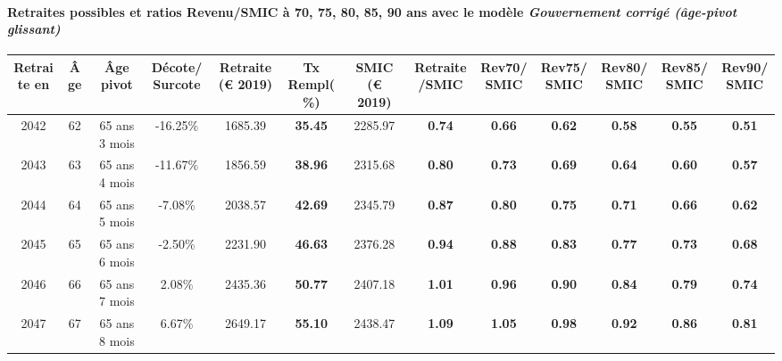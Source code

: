\paragraph{Retraites possibles et ratios Revenu/SMIC à 70, 75, 80, 85, 90 ans avec le modèle \emph{Gouvernement corrigé (âge-pivot glissant)}}  
 
{ \scriptsize \begin{center} 
\begin{tabular}[htb]{|c|c||c|c||c|c||c||c|c|c|c|c|c|} 
\hline 
 Retraite en &  Âge &  Âge pivot &  Décote/Surcote &  Retraite (\euro{} 2019) &  Tx Rempl(\%) &  SMIC (\euro{} 2019) &  Retraite/SMIC &  Rev70/SMIC &  Rev75/SMIC &  Rev80/SMIC &  Rev85/SMIC &  Rev90/SMIC \\ 
\hline \hline 
 2042 &  62 &  65 ans 3 mois &  -16.25\% &  1685.39 &  {\bf 35.45} &  2285.97 &  {\bf {\color{red} 0.74}} &  {\bf {\color{red} 0.66}} &  {\bf {\color{red} 0.62}} &  {\bf {\color{red} 0.58}} &  {\bf {\color{red} 0.55}} &  {\bf {\color{red} 0.51}} \\ 
\hline 
 2043 &  63 &  65 ans 4 mois &  -11.67\% &  1856.59 &  {\bf 38.96} &  2315.68 &  {\bf {\color{red} 0.80}} &  {\bf {\color{red} 0.73}} &  {\bf {\color{red} 0.69}} &  {\bf {\color{red} 0.64}} &  {\bf {\color{red} 0.60}} &  {\bf {\color{red} 0.57}} \\ 
\hline 
 2044 &  64 &  65 ans 5 mois &  -7.08\% &  2038.57 &  {\bf 42.69} &  2345.79 &  {\bf {\color{red} 0.87}} &  {\bf {\color{red} 0.80}} &  {\bf {\color{red} 0.75}} &  {\bf {\color{red} 0.71}} &  {\bf {\color{red} 0.66}} &  {\bf {\color{red} 0.62}} \\ 
\hline 
 2045 &  65 &  65 ans 6 mois &  -2.50\% &  2231.90 &  {\bf 46.63} &  2376.28 &  {\bf {\color{red} 0.94}} &  {\bf {\color{red} 0.88}} &  {\bf {\color{red} 0.83}} &  {\bf {\color{red} 0.77}} &  {\bf {\color{red} 0.73}} &  {\bf {\color{red} 0.68}} \\ 
\hline 
 2046 &  66 &  65 ans 7 mois &  2.08\% &  2435.36 &  {\bf 50.77} &  2407.18 &  {\bf 1.01} &  {\bf {\color{red} 0.96}} &  {\bf {\color{red} 0.90}} &  {\bf {\color{red} 0.84}} &  {\bf {\color{red} 0.79}} &  {\bf {\color{red} 0.74}} \\ 
\hline 
 2047 &  67 &  65 ans 8 mois &  6.67\% &  2649.17 &  {\bf 55.10} &  2438.47 &  {\bf 1.09} &  {\bf 1.05} &  {\bf {\color{red} 0.98}} &  {\bf {\color{red} 0.92}} &  {\bf {\color{red} 0.86}} &  {\bf {\color{red} 0.81}} \\ 
\hline 
\hline 
\end{tabular} 
\end{center} } 
